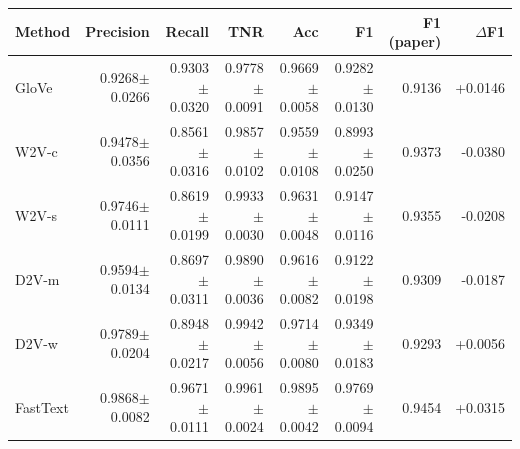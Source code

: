 \begin{tabular}{@{}lrrrrrrr@{}}
\toprule
Method & Precision & Recall & TNR & Acc & F1 & F1 (paper) & $\Delta$F1 \\ \midrule
GloVe & 0.9268$\pm$0.0266 & 0.9303$\pm$0.0320 & 0.9778$\pm$0.0091 & 0.9669$\pm$0.0058 & 0.9282$\pm$0.0130 & 0.9136 & +0.0146 \\
W2V-c & 0.9478$\pm$0.0356 & 0.8561$\pm$0.0316 & 0.9857$\pm$0.0102 & 0.9559$\pm$0.0108 & 0.8993$\pm$0.0250 & 0.9373 & -0.0380 \\
W2V-s & 0.9746$\pm$0.0111 & 0.8619$\pm$0.0199 & 0.9933$\pm$0.0030 & 0.9631$\pm$0.0048 & 0.9147$\pm$0.0116 & 0.9355 & -0.0208 \\
D2V-m & 0.9594$\pm$0.0134 & 0.8697$\pm$0.0311 & 0.9890$\pm$0.0036 & 0.9616$\pm$0.0082 & 0.9122$\pm$0.0198 & 0.9309 & -0.0187 \\
D2V-w & 0.9789$\pm$0.0204 & 0.8948$\pm$0.0217 & 0.9942$\pm$0.0056 & 0.9714$\pm$0.0080 & 0.9349$\pm$0.0183 & 0.9293 & +0.0056 \\
FastText & 0.9868$\pm$0.0082 & 0.9671$\pm$0.0111 & 0.9961$\pm$0.0024 & 0.9895$\pm$0.0042 & 0.9769$\pm$0.0094 & 0.9454 & +0.0315 \\
\bottomrule
\end{tabular}

